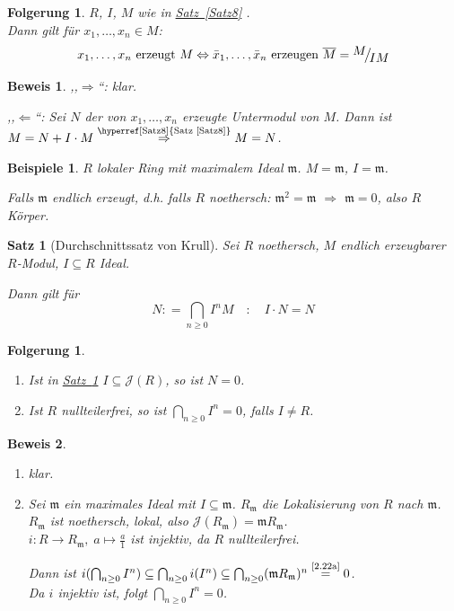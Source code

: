 \documentclass[a4paper,12pt]{scrbook}
\theoremstyle{break}
\newtheorem{Satz}{Satz}
\newtheorem{Folg}[Def]{Folgerung}
\theoremstyle{nonumberbreak}
\newtheorem{Bew}{Beweis}
\newtheorem{nnBsp}{Beispiele}
\theoremstyle{nonumberplain}
\newcommand{\defeqr}[0]{\mathrel{\mathop:}=}
\newcommand{\myref}[2]{%
\hyperref[#2]{#1~\ref*{#2}}%
}
\newcommand{\FakRaum}[2]{
  \raisebox{0.7ex}{\ensuremath{#1}}
  \ensuremath{\mkern-3mu}\big/\ensuremath{\mkern-3mu}
  \raisebox{-0.6ex}{\ensuremath{#2}}}
\begin{document}
\begin{Folg}
\label{2.21}
  $R$, $I$, $M$ wie in \myref{Satz}{Satz8}.\\
  Dann gilt für $x_1, \dots, x_n \in M$:
  \[ x_1, \dots, x_n \text{ erzeugt } M \Leftrightarrow \bar{x}_1, \dots, \bar{x}_n \text{ erzeugen } \overline{M} = \FakRaum{M}{IM} \]
\end{Folg}

\begin{Bew}
  ,,$\Rightarrow$``: klar.

  ,,$\Leftarrow$``: Sei $N$ der von $x_1, \dots, x_n$ erzeugte Untermodul von $M$. Dann ist $M = N + I \cdot M \overset{\text{\myref{Satz}{Satz8}}}{\Rightarrow} M = N$.
\end{Bew}

\begin{nnBsp}
  $R$ lokaler Ring mit maximalem Ideal $\mathfrak{m}$.
  $M = \mathfrak{m}$, $I = \mathfrak{m}$.

  Falls $\mathfrak{m}$ endlich erzeugt, d.h. falls $R$ noethersch:
  $\mathfrak{m}^2 = \mathfrak{m}$ $\Rightarrow$ $\mathfrak{m} = 0$, also $R$ Körper.
\end{nnBsp}

\begin{Satz}[Durchschnittssatz von Krull]
\label{Satz9}
  Sei $R$ noethersch, $M$ endlich erzeugbarer $R$-Modul, $I \subseteq R$ Ideal.

  Dann gilt für $$N \defeqr \bigcap_{n \geq 0} I^n M \quad : \quad I \cdot N = N$$
\end{Satz}

\begin{Folg}\label{2.22}
  \begin{enumerate}
    \item \label{2.22a} Ist in \myref{Satz}{Satz9} $I \subseteq \mathcal{J}(R)$, so ist $N = 0$.
    \item Ist $R$ nullteilerfrei, so ist $\bigcap_{n \geq 0} I^n = 0$, falls $I \neq R$.
  \end{enumerate}
\end{Folg}

\begin{Bew}
  \begin{enumerate}
    \item klar.
    \item Sei $\mathfrak{m}$ ein maximales Ideal mit $I \subseteq \mathfrak{m}$.
    $R_{\mathfrak{m}}$ die Lokalisierung von $R$ nach $\mathfrak{m}$.\\
    $R_{\mathfrak{m}}$ ist noethersch, lokal, also $\mathcal{J}(R_{\mathfrak{m}}) = \mathfrak{m} R_{\mathfrak{m}}$.\\
    $i: R \to R_{\mathfrak{m}}, \; a \mapsto \frac{a}{1}$ ist injektiv, da $R$ nullteilerfrei.

    Dann ist $i(\bigcap_{n \geq 0} I^n) \subseteq \bigcap_{n \geq 0} i(I^n) \subseteq \bigcap_{n \geq 0}(\mathfrak{m} R_{\mathfrak{m}})^n \overset{\text{\ref{2.22a}}}{=} 0$.\\
    Da $i$ injektiv ist, folgt $\bigcap_{n \geq 0} I^n = 0$.
  \end{enumerate}
\end{Bew}
\end{document}
